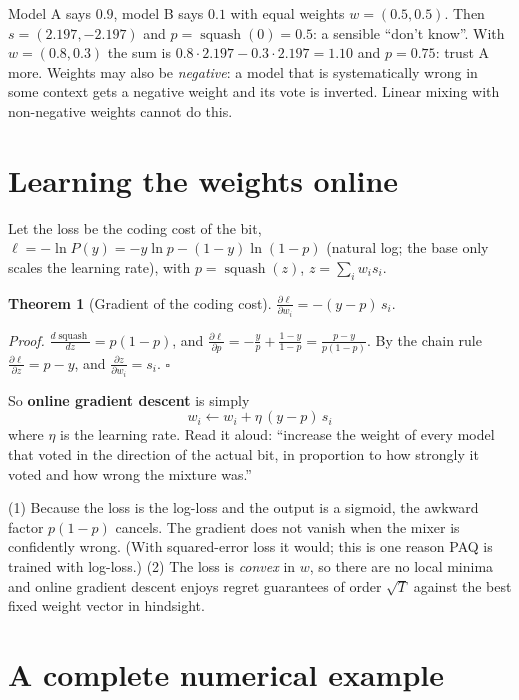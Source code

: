 \documentclass[11pt,a4paper,openany]{book}
\newcommand{\sq}{\operatorname{squash}}
\theoremstyle{definition}
\newtheorem{theorem}{Theorem}[chapter]
\theoremstyle{remark}
\begin{document}
\begin{example}[Disagreement]
Model A says $0.9$, model B says $0.1$ with equal weights $w=(0.5,0.5)$. Then $s=(2.197,-2.197)$ and $p=\sq(0)=0.5$: a sensible ``don't know''. With $w=(0.8,0.3)$ the sum is $0.8\cdot2.197-0.3\cdot2.197=1.10$ and $p=0.75$: trust A more. Weights may also be \emph{negative}: a model that is systematically wrong in some context gets a negative weight and its vote is inverted. Linear mixing with non-negative weights cannot do this.
\end{example}

\section{Learning the weights online}

Let the loss be the coding cost of the bit, $\ell=-\ln P(y)=-y\ln p-(1-y)\ln(1-p)$ (natural log; the base only scales the learning rate), with $p=\sq(z)$, $z=\sum_iw_is_i$.

\begin{theorem}[Gradient of the coding cost]
$\displaystyle\frac{\partial\ell}{\partial w_i}=-(y-p)\,s_i.$
\end{theorem}
\emph{Proof.} $\frac{d\sq}{dz}=p(1-p)$, and $\frac{\partial\ell}{\partial p}=-\frac yp+\frac{1-y}{1-p}=\frac{p-y}{p(1-p)}$. By the chain rule $\frac{\partial\ell}{\partial z}=p-y$, and $\frac{\partial z}{\partial w_i}=s_i$. $\square$

So \textbf{online gradient descent} is simply
\[
\boxed{\;w_i\leftarrow w_i+\eta\,(y-p)\,s_i\;}
\]
where $\eta$ is the learning rate. Read it aloud: ``increase the weight of every model that voted in the direction of the actual bit, in proportion to how strongly it voted and how wrong the mixture was.''

\begin{keyidea}
(1) Because the loss is the log-loss and the output is a sigmoid, the awkward factor $p(1-p)$ cancels. The gradient does not vanish when the mixer is confidently wrong. (With squared-error loss it would; this is one reason PAQ is trained with log-loss.) (2) The loss is \emph{convex} in $w$, so there are no local minima and online gradient descent enjoys regret guarantees of order $\sqrt T$ against the best fixed weight vector in hindsight.
\end{keyidea}

\section{A complete numerical example}
\end{document}
